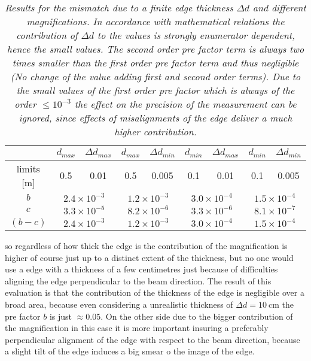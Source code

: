 \vspace{1cm} 
\begin{table}[h] 
	\begin{center}	
		\begin{tabular}{c||c|c||c|c||c|c||c|c}
			&$d_{max}$&$\Delta d_{max}$&$d_{max}$&$\Delta d_{min}$&$d_{min}$ &$\Delta d_{max}$&$d_{min}$& $\Delta d_{min}$ \\ 
			\hline \rule{0pt}{12pt} limits [m] & 0.5 & 0.01 & 0.5 & 0.005 & 0.1 & 0.01 & 0.1 & 0.005 \\ \hline
			\hline \rule{0pt}{13pt} $b$	& \multicolumn{2}{c||}{$2.4\times 10^{-3}$}  & \multicolumn{2}{c||}{$1.2\times 10^{-3}$}   & \multicolumn{2}{c||}{$3.0\times 10^{-4}$}   & \multicolumn{2}{c}{$1.5\times 10^{-4}$}   \\ 
			\hline \rule{0pt}{13pt} $c$	& \multicolumn{2}{c||}{$3.3\times 10^{-5}$}  & \multicolumn{2}{c||}{$8.2\times 10^{-6}$}   & \multicolumn{2}{c||}{$3.3\times 10^{-6}$}   & \multicolumn{2}{c}{$8.1\times 10^{-7}$}   \\  
			\hline \rule{0pt}{13pt} $(b-c)$	& \multicolumn{2}{c||}{$2.4\times 10^{-3}$}  & \multicolumn{2}{c||}{$1.2\times 10^{-3}$}   & \multicolumn{2}{c||}{$3.0\times 10^{-4}$}   & \multicolumn{2}{c}{$1.5\times 10^{-4}$}   \\	  
		\end{tabular}
		\caption[Results for the mismatch due to a finite edge thickness $\Delta d$ at different magnifications]{\textit{Results for the mismatch due to a finite edge thickness $\Delta d$ and different magnifications. In accordance with mathematical relations the contribution of $\Delta d$ to the values is strongly enumerator dependent, hence the small values. The second order pre factor term is always two times smaller than the first order pre factor term and thus negligible (No change of the value adding first and second order terms). Due to the small values of the first order pre factor which is always of the order $\leq 10^{-3}$ the effect on the precision of the measurement can be ignored, since effects of misalignments of the edge deliver a much higher contribution.}}
		\label{mismatch}
	\end{center}    
\end{table}  
so regardless of how thick the edge is the contribution of the magnification is higher of course just up to a distinct extent of the thickness, but no one would use a edge with a thickness of a few centimetres just because of difficulties aligning the edge perpendicular to the beam direction. The result of this evaluation is that the contribution of the thickness of the edge is negligible over a broad area, because even considering a unrealistic thickness of $\Delta d = 10\ $cm the pre factor $b$ is just $\approx 0.05$. On the other side due to the bigger contribution of the magnification in this case it is more important insuring a preferably perpendicular alignment of the edge with respect to the beam direction, because a slight tilt of the edge induces a big smear o the image of the edge. 


